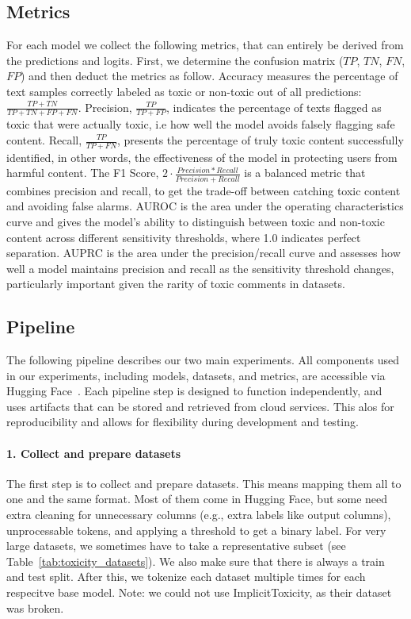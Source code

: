 \subsection{Metrics}
\label{sec:metrics}
For each model we collect the following metrics, that can entirely be derived from the predictions and logits. First, we determine the confusion matrix ($TP$, $TN$, $FN$, $FP$) and then deduct the metrics as follow. Accuracy measures the percentage of text samples correctly labeled as toxic or non-toxic out of all predictions: $\frac{TP+TN}{
TP+TN+FP+FN}$. Precision, $\frac{TP}{TP + FP}$, indicates the percentage of texts flagged as toxic that were actually toxic, i.e how well the model avoids falsely flagging safe content. Recall, $\frac{TP}{TP + FN}$, presents the percentage of truly toxic content successfully identified, in other words, the effectiveness of the model in protecting users from harmful content. The F1 Score, $2\cdot\frac{Precision*Recall}{Precision+Recall}$ is a balanced metric that combines precision and recall, to get the trade-off between catching toxic content and avoiding false alarms. AUROC is the area under the operating characteristics curve and gives the model's ability to distinguish between toxic and non-toxic content across different sensitivity thresholds, where 1.0 indicates perfect separation. AUPRC is the area under the precision/recall curve and assesses how well a model maintains precision and recall as the sensitivity threshold changes, particularly important given the rarity of toxic comments in datasets.

\subsection{Pipeline}
\label{sec:evaluation}
The following pipeline describes our two main experiments.  
All components used in our experiments, including models, datasets, and metrics, are accessible via Hugging Face~\cite{datasets_models_results}. Each pipeline step is designed to function independently, and uses artifacts that can be stored and retrieved from cloud services. This  alos for reproducibility and allows for flexibility during development and testing.
\paragraph{1. Collect and prepare datasets}
The first step is to collect and prepare datasets. This means mapping them all to one and the same format. Most of them come in Hugging Face, but some need extra cleaning for unnecessary columns (e.g., extra labels like output columns), unprocessable tokens, and applying a threshold to get a binary label. For very large datasets, we sometimes have to take a representative subset (see Table~\ref{tab:toxicity_datasets}). We also make sure that there is always a train and test split. After this, we tokenize each dataset multiple times for each respecitve base model. Note: we could not use ImplicitToxicity, as their dataset was broken.

